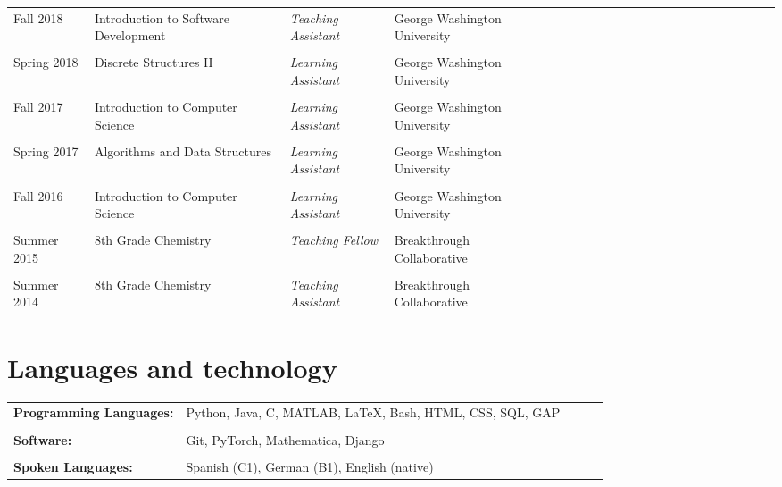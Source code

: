 \documentclass[a4paper,10pt]{article}
\begin{document}
{\def\next{\\\\[-0.2cm]}\fontsize{10}{12pt}\selectfont
\begin{tabular}{@{}lP{6.3cm}lP{8.3cm}r@{}}

Fall 2018 	  & 	Introduction to Software Development & \emph{Teaching Assistant } & George Washington University \next
Spring 2018 	  & 	Discrete Structures II & \emph{Learning Assistant} & George Washington University \next
Fall 2017	 	& 	Introduction to Computer Science &  \emph{Learning Assistant} & George Washington University \next
Spring 2017	 	& 	Algorithms and Data Structures &  \emph{Learning Assistant}  & George Washington University\next
Fall 2016	 	& 	Introduction to Computer Science &  \emph{Learning Assistant} & George Washington University \next
Summer 2015		&	  8th Grade Chemistry	 	& \emph{Teaching Fellow} & Breakthrough Collaborative \next
Summer 2014    &   8th Grade Chemistry   & \emph{Teaching Assistant} & Breakthrough Collaborative

\end{tabular}}

\section{Languages and technology}
{\def\next{\\\\[-0.2cm]}\fontsize{10}{12pt}\selectfont
\begin{tabular}{@{}lP{18.3cm}lP{20.3cm}r@{}}
\textbf{Programming Languages:} & Python, Java, C, MATLAB, LaTeX, Bash, HTML, CSS, SQL, GAP \next
\textbf{Software:} & Git, PyTorch, Mathematica,  Django \next
\textbf{Spoken Languages:} & Spanish (C1), German (B1), English (native)
\end{tabular}}
\end{document}
